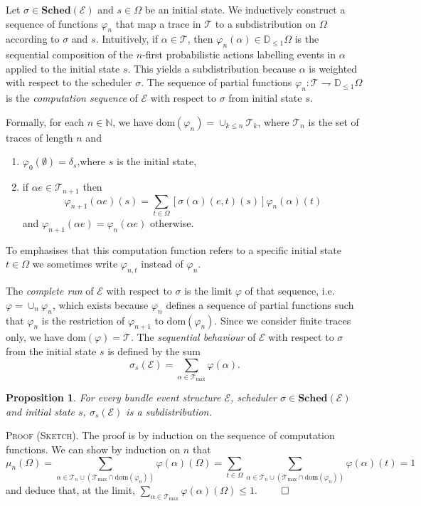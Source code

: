 \documentclass[review]{elsart}
\newtheorem{proposition}[definition]{Proposition}
\newenvironment{proofsummary}{\par
\noindent
\textsc{Proof (Sketch). }
\noindent}{\hfill\(\qed\)}
\newcommand{\Nat}{{\mathbb N}}
\newcommand{\Jip}{\mathbb{D}_{\le1}}
\newcommand{\pto}{\rightharpoondown}
\newcommand{\dom}{\mathrm{dom}}
\newcommand{\EE}{\mathcal{E}}
\newcommand{\TT}{\mathcal{T}}
\newcommand{\sched}{\mathbf{Sched}}
\begin{document}
Let $\sigma{\in}\sched(\EE)$ and $s{\in}\Omega$ be an initial state. We inductively construct a sequence of functions $\varphi_n$ that map a trace in $\TT$ to a subdistribution on $\Omega$ according to $\sigma$ and $s$. Intuitively, if $\alpha{\in}\TT$, then $\varphi_n(\alpha){\in}\Jip\Omega$ is the sequential composition of the $n$-first probabilistic actions labelling events in $\alpha$ applied to the initial state $s$. This yields a subdistribution because $\alpha$ is weighted with respect to the scheduler $\sigma$. The sequence of partial functions $\varphi_n{:}\TT{\pto}\Jip\Omega$ is the \emph{computation sequence} of $\EE$ with respect to $\sigma$  from initial state $s$.

Formally, for each $n{\in}\Nat$, we have $\dom(\varphi_n) {=} {\cup}_{k\leq n}\TT_k$, where $\TT_n$ is the set of traces of length $n$ and 

\begin{enumerate}
\item $\varphi_0(\emptyset) {=} \delta_s$,where $s$ is the initial state,
\item if $\alpha e{\in}\TT_{n{+}1}$ then 
\[
	\varphi_{n{+}1}(\alpha e)(s) = \sum_{t{\in}\Omega}[\sigma(\alpha)(e,t)(s)]\varphi_n(\alpha)(t)
\]
and  $\varphi_{n{+}1}(\alpha e) {=} \varphi_n(\alpha e)$ otherwise.\label{pr:induction-computation-function}
\end{enumerate}

To emphasises that this computation function refers to a specific initial state $t{\in}\Omega$ we sometimes write $\varphi_{n,t}$ instead of $\varphi_n$.

The \textit{complete run} of $\EE$ with respect to $\sigma$ is the limit $\varphi$ of that sequence, i.e. $\varphi {=} {\cup}_n\varphi_n$, which exists because $\varphi_n$ defines a sequence of partial functions such that $\varphi_{n}$ is the restriction of $\varphi_{n{+}1}$ to $\dom(\varphi_n)$. Since we consider finite traces only, we have $\dom(\varphi) {=} \TT$. The \textit{sequential behaviour} of $\EE$ with respect to $\sigma$ from the initial state $s$ is defined by the sum \[
	\sigma_s(\EE) = \sum_{\alpha{\in}\TT_{\max}}\varphi(\alpha).
\]

\begin{proposition}\label{pro:scheduler-well-defined}
For every bundle event structure $\EE$, scheduler $\sigma{\in}\sched(\EE)$ and initial state $s$, $\sigma_s(\EE)$ is a subdistribution. 
\end{proposition}

\begin{proofsummary}
The proof is by induction on the sequence of computation functions. We can show by induction on $n$ that 
\[
	\mu_{n}(\Omega) = \sum_{\alpha{\in} \TT_{n}{\cup}(\TT_{\max}{\cap} \dom(\varphi_n))}\varphi(\alpha)(\Omega) = \sum_{t{\in}\Omega} \sum_{\alpha{\in} \TT_{n}{\cup}(\TT_{\max}{\cap} \dom(\varphi_n))}\varphi(\alpha)(t) = 1
\]
and deduce that, at the limit, $\sum_{\alpha{\in}\TT_{\max}}\varphi(\alpha)(\Omega) \leq 1$.
\end{proofsummary}
\end{document}
